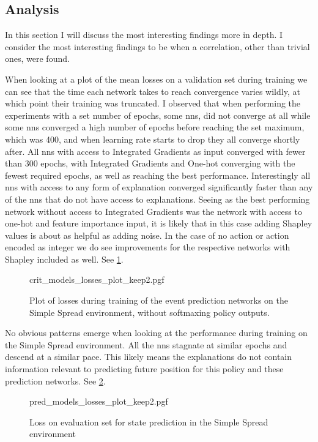 \documentclass[UKenglish]{uiomasterthesis}
\begin{document}
\subsection{Analysis}
In this section I will discuss the most interesting findings more in depth. I consider the most interesting findings to be when a correlation, other than trivial ones, were found.


When looking at a plot of the mean losses on a validation set during training we can see that the time each network takes to reach convergence varies wildly, at which point their training was truncated. I observed that when performing the experiments with a set number of epochs, some \acp{nn}, did not converge at all while some \acp{nn} converged a high number of epochs before reaching the set maximum, which was 400, and when learning rate starts to drop they all converge shortly after. All \acp{nn} with access to Integrated Gradients as input converged with fewer than 300 epochs, with Integrated Gradients and One-hot converging with the fewest required epochs, as well as reaching the best performance. Interestingly all \acp{nn} with access to any form of explanation converged significantly faster than any of the \acp{nn} that do not have access to explanations. Seeing as the best performing network without access to Integrated Gradients was the network with access to one-hot and feature importance input, it is likely that in this case adding Shapley values is about as helpful as adding noise. In the case of no action or action encoded as integer we do see improvements for the respective networks with Shapley included as well. See \cref{fig:crit_losses_log}.

\begin{figure}[H]
    \centering
    {crit_models_losses_plot_keep2.pgf}
    \caption{Plot of losses during training of the event prediction networks on the Simple Spread environment, without softmaxing policy outputs.}
	\label{fig:crit_losses_log}
\end{figure}

No obvious patterns emerge when looking at the performance during training on the Simple Spread environment. All the \acp{nn} stagnate at similar epochs and descend at a similar pace. This likely means the explanations do not contain information relevant to predicting future position for this policy and these prediction networks. See \cref{fig:pred_losses}.

\begin{figure}[H]
    \centering
    {pred_models_losses_plot_keep2.pgf}
    \caption{Loss on evaluation set for state prediction in the Simple Spread environment}
	\label{fig:pred_losses}
\end{figure}
\end{document}
